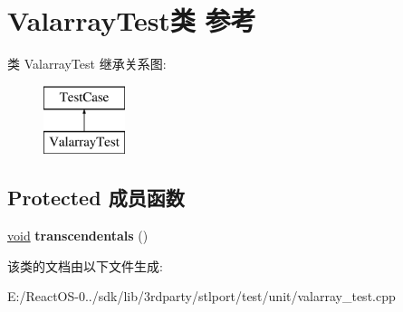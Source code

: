 \hypertarget{class_valarray_test}{}\section{Valarray\+Test类 参考}
\label{class_valarray_test}
类 Valarray\+Test 继承关系图\+:\begin{figure}[H]
\begin{center}
\leavevmode
\includegraphics[height=2.000000cm]{class_valarray_test}
\end{center}
\end{figure}
\subsection*{Protected 成员函数}
\begin{DoxyCompactItemize}
\item 
\mbox{\label{class_valarray_test_a2a08aaff21c121732a1c5a8ce604b61f}} 
\hyperlink{interfacevoid}{void} {\bfseries transcendentals} ()
\end{DoxyCompactItemize}


该类的文档由以下文件生成\+:\begin{DoxyCompactItemize}
\item 
E\+:/\+React\+O\+S-\/0../sdk/lib/3rdparty/stlport/test/unit/valarray\+\_\+test.\+cpp\end{DoxyCompactItemize}
